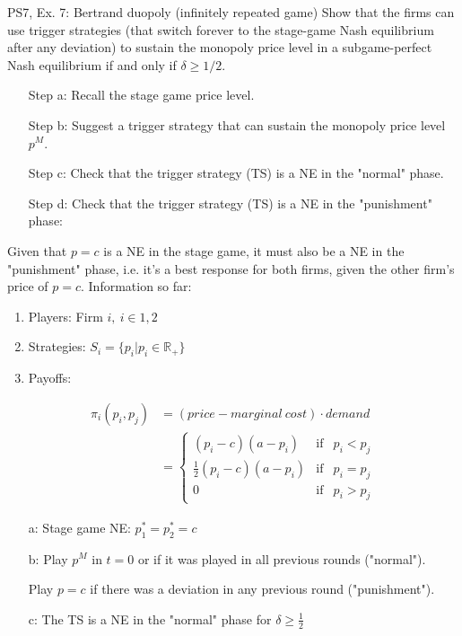 \begin{frame}{PS7, Ex. 7: Bertrand duopoly (infinitely repeated game)}
    Show that the firms can use trigger strategies (that switch forever to the stage-game Nash equilibrium after any deviation) to sustain the monopoly price level in a subgame-perfect Nash equilibrium if and only if $\delta\geq1/2$.
    \vspace{-6pt}
    \begin{multicols}{2}
      \begin{itemize}
        \item[Step a:] Recall the stage game price level.
        \item[Step b:] Suggest a trigger strategy that can sustain the monopoly price level $p^M$.
        \item[Step c:] Check that the trigger strategy (TS) is a NE in the "normal" phase.
        \item[Step d:] Check that the trigger strategy (TS) is a NE in the "punishment" phase:
      \end{itemize}
      \vspace{-4pt}
      Given that $p=c$ is a NE in the stage game, it must also be a NE in the "punishment" phase, i.e. it's a best response for both firms, given the other firm's price of $p=c$.
      \vfill\null\columnbreak
      Information so far:
      \vspace{-4pt}
      \begin{enumerate}
        \item Players: Firm $i,\ i\in1,2$
        \item Strategies: $S_i=\{p_i|p_i\in\mathbb{R}_+\}$
        \item Payoffs:
      \end{enumerate}
      \vspace{-12pt}
      \begin{align*}
        \pi_i(p_i,p_j)&=(price-marginal\ cost)\cdot demand\\
                      &=\left\{\begin{array}{lcl}
          (p_i-c)(a-p_i)            & \text{if} & p_i<p_j\\
          \frac{1}{2}(p_i-c)(a-p_i) & \text{if} & p_i=p_j\\
          0                         & \text{if} & p_i>p_j
        \end{array}\right.
      \end{align*}
      \vspace{-16pt}
      \begin{itemize}
        \item[a:] Stage game NE: $p_1^*=p_2^*=c$
        \item[b:] Play $p^M$ in $t=0$ or if it was played in all previous rounds ("normal").
        \item[]   Play $p=c$ if there was a deviation in any previous round ("punishment").
        \item[c:] The TS is a NE in the "normal" phase for $\delta\geq\frac{1}{2}$
      \end{itemize}
      \vfill\null
    \end{multicols}
\end{frame}
